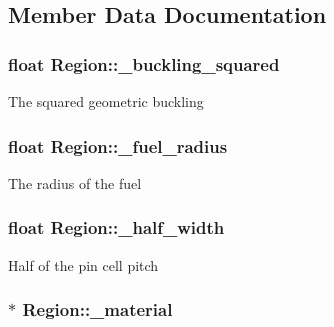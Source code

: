 \subsection{Member Data Documentation}
\hypertarget{classRegion_a2731c8000023342a08a5799e0aa5c0d2}{
\subsubsection[{\-\_\-buckling\-\_\-squared}]{\setlength{\rightskip}{0pt plus 5cm}float Region\-::\-\_\-buckling\-\_\-squared\hspace{0.3cm}{\ttfamily [private]}}}\label{classRegion_a2731c8000023342a08a5799e0aa5c0d2}
The squared geometric buckling \hypertarget{classRegion_a344918fd4f1847efd6be99f2326eaa87}{
\subsubsection[{\-\_\-fuel\-\_\-radius}]{\setlength{\rightskip}{0pt plus 5cm}float Region\-::\-\_\-fuel\-\_\-radius\hspace{0.3cm}{\ttfamily [private]}}}\label{classRegion_a344918fd4f1847efd6be99f2326eaa87}
The radius of the fuel \hypertarget{classRegion_a62b5f5e778d5e95d6289d0f0948a312c}{
\subsubsection[{\-\_\-half\-\_\-width}]{\setlength{\rightskip}{0pt plus 5cm}float Region\-::\-\_\-half\-\_\-width\hspace{0.3cm}{\ttfamily [private]}}}\label{classRegion_a62b5f5e778d5e95d6289d0f0948a312c}
Half of the pin cell pitch \hypertarget{classRegion_afeb207eb640d2543a9b5a1bb2097c50d}{
\subsubsection[{\-\_\-material}]{$\ast$ Region\-::\-\_\-material\hspace{0.3cm}{\ttfamily [private]}}}\label{classRegion_afeb207eb640d2543a9b5a1bb2097c50d}

